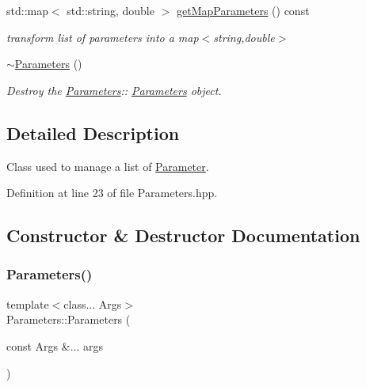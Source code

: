 \begin{DoxyCompactItemize}
std\+::map$<$ std\+::string, double $>$ \hyperlink{classParameters_a3951bee7d4347d18d528cd0f5c3a2e67}{get\+Map\+Parameters} () const
\begin{DoxyCompactList}\small\item\em transform list of parameters into a map$<$string,double$>$ \end{DoxyCompactList}\item 
\mbox{\label{classParameters_a640a1a349975a8cb023696f25e563a5c}} 
\hyperlink{classParameters_a640a1a349975a8cb023696f25e563a5c}{$\sim$\+Parameters} ()
\begin{DoxyCompactList}\small\item\em Destroy the \hyperlink{classParameters}{Parameters}\+:\+: \hyperlink{classParameters}{Parameters} object. \end{DoxyCompactList}\end{DoxyCompactItemize}


\subsection{Detailed Description}
Class used to manage a list of \hyperlink{classParameter}{Parameter}. 

Definition at line 23 of file Parameters.\+hpp.



\subsection{Constructor \& Destructor Documentation}
\mbox{\label{classParameters_ad6dd615ae7b15ad277796f0ea5d15442}} 
\subsubsection{\texorpdfstring{Parameters()}{Parameters()}}
{\footnotesize\ttfamily template$<$class... Args$>$ \\
Parameters\+::\+Parameters (\begin{DoxyParamCaption}\item[{const Args \&...}]{args }\end{DoxyParamCaption})\hspace{0.3cm}{\ttfamily [explicit]}}



